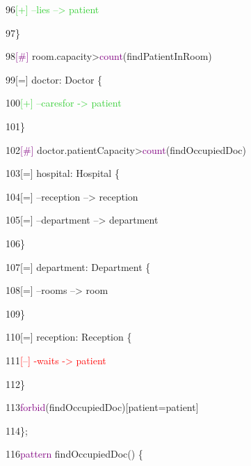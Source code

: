{{96\hspace{1.5cm}\textcolor{LimeGreen}{[+] --lies --> patient}

97\hspace{1cm}\}

98\hspace{1cm}\textcolor{Purple}{[\#] }room.capacity>\textcolor{Purple}{count}(findPatientInRoom)

99\hspace{1cm}[=] doctor: Doctor \{

100\hspace{1.5cm}\textcolor{LimeGreen}{[+] --caresfor -> patient}

101\hspace{1cm}\}

102\hspace{1cm}\textcolor{Purple}{[\#] }doctor.patientCapacity>\textcolor{Purple}{count}(findOccupiedDoc)

103\hspace{1cm}[=] hospital: Hospital \{

104\hspace{1.5cm}[=] --reception --> reception

105\hspace{1.5cm}[=] --department --> department

106\hspace{1cm}\}

107\hspace{1cm}[=] department: Department \{

108\hspace{1.5cm}[=] --rooms --> room

109\hspace{1cm}\}

110\hspace{1cm}[=] reception: Reception \{

111\hspace{1.5cm}\textcolor{red}{[--] -waits -> patient}

112\hspace{1cm}\}

113\hspace{1cm}\textcolor{Purple}{forbid}(findOccupiedDoc)[patient=patient]

114\hspace{0.5cm}\};\newline

116\hspace{0.5cm}\textcolor{Purple}{pattern} findOccupiedDoc() \{

}}
